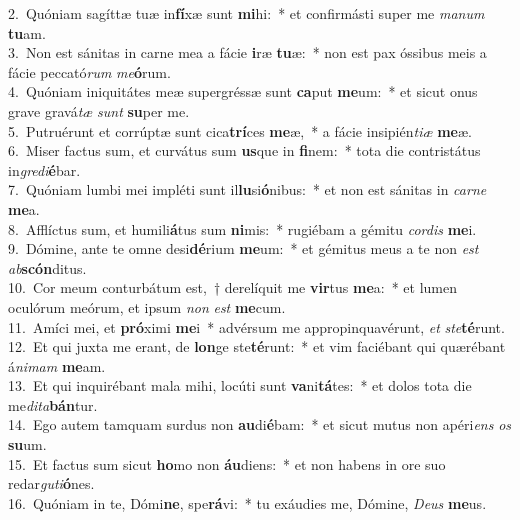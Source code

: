 {2.~}Quóniam sagíttæ tuæ in\textbf{fí}xæ sunt \textbf{mi}hi:~* et confirmásti super me \textit{ma}\textit{num} \textbf{tu}am.\\
{3.~}Non est sánitas in carne mea a fácie \textbf{i}ræ \textbf{tu}æ:~* non est pax óssibus meis a fácie peccató\textit{rum} \textit{me}\textbf{ó}rum.\\
{4.~}Quóniam iniquitátes meæ supergréssæ sunt \textbf{ca}put \textbf{me}um:~* et sicut onus grave gravá\textit{tæ} \textit{sunt} \textbf{su}per me.\\
{5.~}Putruérunt et corrúptæ sunt cica\textbf{trí}ces \textbf{me}æ,~* a fácie insipién\textit{ti}\textit{æ} \textbf{me}æ.\\
{6.~}Miser factus sum, et curvátus sum \textbf{us}que in \textbf{fi}nem:~* tota die contristátus in\textit{gre}\textit{di}\textbf{é}bar.\\
{7.~}Quóniam lumbi mei impléti sunt il\textbf{lu}si\textbf{ó}nibus:~* et non est sánitas in \textit{car}\textit{ne} \textbf{me}a.\\
{8.~}Afflíctus sum, et humili\textbf{á}tus sum \textbf{ni}mis:~* rugiébam a gémitu \textit{cor}\textit{dis} \textbf{me}i.\\
{9.~}Dómine, ante te omne desi\textbf{dé}rium \textbf{me}um:~* et gémitus meus a te non \textit{est} \textit{ab}\textbf{scón}ditus.\\
{10.~}Cor meum conturbátum est,~† derelíquit me \textbf{vir}tus \textbf{me}a:~* et lumen oculórum meórum, et ipsum \textit{non} \textit{est} \textbf{me}cum.\\
{11.~}Amíci mei, et \textbf{pró}ximi \textbf{me}i~* advérsum me appropinquavérunt, \textit{et} \textit{ste}\textbf{té}runt.\\
{12.~}Et qui juxta me erant, de \textbf{lon}ge ste\textbf{té}runt:~* et vim faciébant qui quærébant á\textit{ni}\textit{mam} \textbf{me}am.\\
{13.~}Et qui inquirébant mala mihi, locúti sunt \textbf{va}ni\textbf{tá}tes:~* et dolos tota die me\textit{di}\textit{ta}\textbf{bán}tur.\\
{14.~}Ego autem tamquam surdus non \textbf{au}di\textbf{é}bam:~* et sicut mutus non apéri\textit{ens} \textit{os} \textbf{su}um.\\
{15.~}Et factus sum sicut \textbf{ho}mo non \textbf{áu}diens:~* et non habens in ore suo redar\textit{gu}\textit{ti}\textbf{ó}nes.\\
{16.~}Quóniam in te, Dómi\textbf{ne}, spe\textbf{rá}vi:~* tu exáudies me, Dómine, \textit{De}\textit{us} \textbf{me}us.\\
